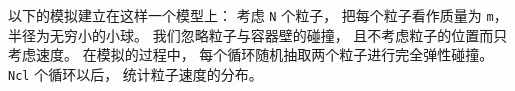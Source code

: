 
以下的模拟建立在这样一个模型上： 考虑 \verb|N| 个粒子， 把每个粒子看作质量为 \verb|m|， 半径为无穷小的小球。 我们忽略粒子与容器壁的碰撞， 且不考虑粒子的位置而只考虑速度。 在模拟的过程中， 每个循环随机抽取两个粒子进行完全弹性碰撞。 \verb|Ncl| 个循环以后， 统计粒子速度的分布。
